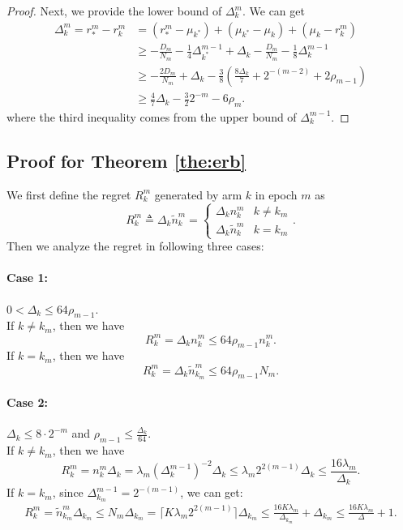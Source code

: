 \begin{proof}
    Next, we provide the lower bound of $\Delta_k^m$. We can get
    \begin{equation*}
    \begin{split}
        \Delta_k^m =  r_*^m - r_k^m
        &= (r_*^m - \mu_{k^*}) + (\mu_{k^*} - \mu_k) + (\mu_k - r_k^m) \\
        &\geq -\frac{D_m}{N_m} - \frac{1}{4}\Delta_{k^*}^{m-1} + \Delta_k -\frac{D_m}{N_m} - \frac{1}{8}\Delta_k^{m-1} \\
        &\geq -\frac{2D_m}{N_m} + \Delta_k - \frac{3}{8}\left(\frac{8 \Delta_k}{7} + 2^{-(m-2)} + 2\rho_{m-1}\right) \\
        &\geq \frac{4}{7}\Delta_k - \frac{3}{2}2^{-m} - 6\rho_m.
    \end{split}
    \end{equation*}
    where the third inequality comes from the upper bound of $\Delta_k^{m-1}$.
\end{proof}

\subsection{Proof for Theorem \ref{the:erb}}

We first define the regret $R_k^m$ generated by arm $k$ in epoch $m$ as 
\[R_k^m\triangleq\Delta_k\widetilde{n}_{k}^m=\begin{cases}
    \Delta_kn_{k}^m & k\neq k_m\\
    \Delta_k\widetilde{n}_{k}^m & k=k_m
\end{cases}.\]
Then we analyze the regret in following three cases:

\paragraph{Case 1:} $0<\Delta_k\le 64\rho_{m-1}$.\\ %
If $k \neq k_m$, then we have \[R_k^m=\Delta_k n_{k}^m\le 64\rho_{m-1}n_k^m .\] 
If $k=k_m$, then we have \[R_k^m=\Delta_k\widetilde{n}_{k_m}^m\le 64\rho_{m-1}N_m.\]

\paragraph{Case 2:} $\Delta_k \leq 8 \cdot 2^{-m}$ and $\rho_{m-1} \leq \frac{\Delta_k}{64}$.\\
If $k \neq k_m$, then we have \[R_k^m=n_{k}^m\Delta_k =\lambda_m(\Delta_k^{m-1})^{-2} \Delta_k \leq \lambda_m 2^{2(m-1)} \Delta_k  \leq \frac{16 \lambda_m}{\Delta_k}.\] 
If $k=k_m$, since $\Delta_{k_m}^{m-1} = 2^{-(m-1)}$, we can get:
\begin{align*}
    R_k^m=\widetilde{n}_{k_m}^m \Delta_{k_m} \leq 
    N_m\Delta_{k_m} = \lceil K\lambda_m 2^{2(m-1)}\rceil \Delta_{k_m} \leq \frac{16K\lambda_m}{\Delta_{k_m}} + \Delta_{k_m} \leq \frac{16K\lambda_m}{\Delta} + 1.
\end{align*}

